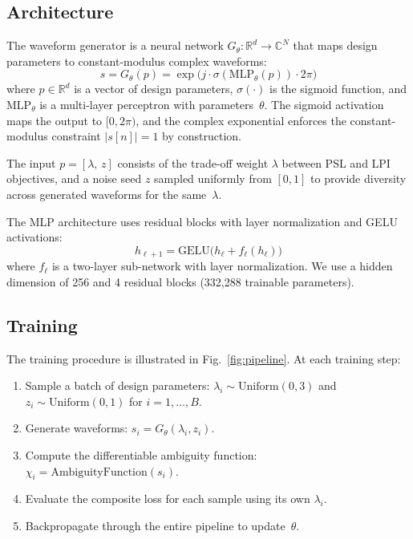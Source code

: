 \documentclass[journal]{IEEEtran}
\begin{document}
\subsection{Architecture}

The waveform generator is a neural network $G_\theta : \mathbb{R}^d \rightarrow \mathbb{C}^N$ that maps design parameters to constant-modulus complex waveforms:
\begin{equation}
s = G_\theta(p) = \exp\!\big(j \cdot \sigma(\text{MLP}_\theta(p)) \cdot 2\pi\big)
\label{eq:generator}
\end{equation}
where $p \in \mathbb{R}^d$ is a vector of design parameters, $\sigma(\cdot)$ is the sigmoid function, and $\text{MLP}_\theta$ is a multi-layer perceptron with parameters~$\theta$.
The sigmoid activation maps the output to $[0, 2\pi)$, and the complex exponential enforces the constant-modulus constraint $|s[n]| = 1$ by construction.

The input $p = [\lambda, \, z]$ consists of the trade-off weight $\lambda$ between PSL and LPI objectives, and a noise seed $z$ sampled uniformly from $[0, 1]$ to provide diversity across generated waveforms for the same~$\lambda$.

The MLP architecture uses residual blocks with layer normalization and GELU activations:
\begin{equation}
h_{\ell+1} = \text{GELU}\!\big(h_\ell + f_\ell(h_\ell)\big)
\label{eq:residual}
\end{equation}
where $f_\ell$ is a two-layer sub-network with layer normalization.
We use a hidden dimension of 256 and 4 residual blocks (332{,}288 trainable parameters).

\subsection{Training}
\label{sec:training}

The training procedure is illustrated in Fig.~\ref{fig:pipeline}.
At each training step:

\begin{enumerate}
    \item Sample a batch of design parameters: $\lambda_i \sim \text{Uniform}(0, 3)$ and $z_i \sim \text{Uniform}(0, 1)$ for $i = 1, \ldots, B$.
    \item Generate waveforms: $s_i = G_\theta(\lambda_i, z_i)$.
    \item Compute the differentiable ambiguity function: $\chi_i = \text{AmbiguityFunction}(s_i)$.
    \item Evaluate the composite loss for each sample using its own $\lambda_i$.
    \item Backpropagate through the entire pipeline to update~$\theta$.
\end{enumerate}
\end{document}
